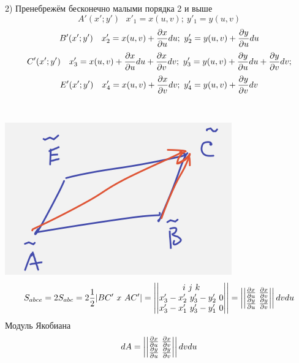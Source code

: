 \documentclass{article}
\begin{document}
2) Пренебрежём бесконечно малыми порядка 2 и выше
\begin{equation*}
    A'(x';y')\ \ \ x'_1 = x(u, v);\ y'_1 = y(u, v)
\end{equation*}
\begin{equation*}
    B'(x';y')\ \ \ x'_2 = x(u, v) + \pdv{x}{u}du;\ y'_2 = y(u, v) + \pdv{y}{u}du
\end{equation*}
\begin{equation*}
    C'(x';y')\ \ \ x'_3 = x(u, v) + \pdv{x}{u}du + \pdv{x}{v}dv;\ y'_3 = y(u, v) + \pdv{y}{u}du + \pdv{y}{v}dv;
\end{equation*}
\begin{equation*}
    E'(x';y')\ \ \ x'_4 = x(u, v) + \pdv{x}{v}dv;\ y'_4 = y(u, v) + \pdv{y}{v}dv
\end{equation*}
\\ \\
\includegraphics[width=.3\textwidth]{paral.png} 
\begin{equation*}
    S_{abce}= 2 S_{abc} = 2\frac{1}{2}|BC'\ x \ AC'| = 
    \left|\left|\begin{matrix}
        i\ j\ k\\
        x'_3-x_2'\ y'_3-y_2'\ 0\\
        x'_3-x_1'\ y'_3-y_1'\ 0
    \end{matrix}\right|\right|= 
    \left|\left|\begin{matrix}
        \pdv{x}{u}\ \pdv{x}{v}\\
        \pdv{y}{u}\ \pdv{y}{v}
    \end{matrix}\right|\right|dvdu
\end{equation*}
Модуль Якобиана
\begin{equation*}
    dA =  
    \left|\left|\begin{matrix}
        \pdv{x}{u}\ \pdv{x}{v}\\
        \pdv{y}{u}\ \pdv{y}{v}
    \end{matrix}\right|\right|dvdu
\end{equation*}

    
\end{document}
